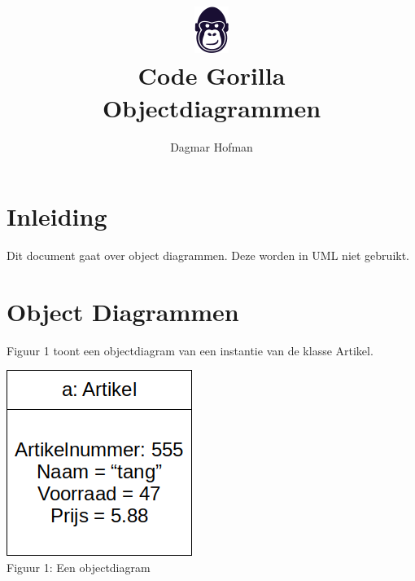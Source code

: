 \documentclass{article}
\title{ \includegraphics[scale=1]{gorilla.png} \\ Code Gorilla \\ Objectdiagrammen}
\author{Dagmar Hofman}
\date{}
\begin{document}
	\maketitle
	\newpage
	\tableofcontents
	\newpage
	\section{Inleiding}
	
	Dit document gaat over object diagrammen. Deze worden in UML niet gebruikt. 
	
	\section{Object Diagrammen}
	
	Figuur 1 toont een objectdiagram van een instantie van de klasse Artikel. \\
	
	\bigskip

	\includegraphics{objectdiagram1.png} \\

	Figuur 1: Een objectdiagram \\
			
	\bigskip
	
	
	
\end{document}
